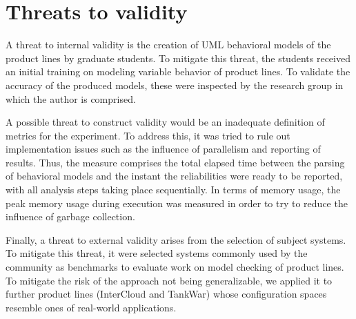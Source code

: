 \section{Threats to validity \label{sec:threatsValidity}}

A threat to internal validity is the creation of UML behavioral models of the
product lines by graduate students. To mitigate this threat, the students
received an initial training on modeling variable behavior of product lines. To
validate the accuracy of the produced models, these  were inspected by the
research group in which the author is comprised. 


A possible threat to construct validity would be an inadequate definition of
metrics for the experiment.  To address this, it was tried to rule out
implementation issues such as the influence of parallelism and reporting of
results.  Thus, the measure comprises the total elapsed time between the parsing of
behavioral models and the instant the reliabilities were ready to be reported,
with all analysis steps taking place sequentially.  In terms of memory usage, the peak memory
usage during execution was measured in order to try to reduce the influence of garbage collection.


Finally, a threat to external validity arises from the selection of subject
systems. To mitigate this threat, it were selected systems commonly used by the
community as benchmarks to evaluate work on model checking of product lines.  To
mitigate the risk of the approach not being generalizable, we applied it to
further product lines (InterCloud and TankWar) whose configuration spaces
resemble ones of real-world applications.









